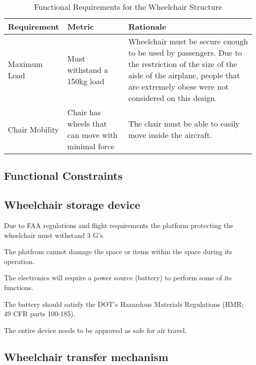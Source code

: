 \begin{table}
\begin{tabular} {| p{4cm} | p{5cm} | p{5cm} |}
\hline
\textbf{Requirement} & \textbf{Metric} & \textbf{Rationale} \\ \hline

Maximum Load & Must withstand a 150kg load & Wheelchair must be secure enough to be used by passengers. Due to the restriction of the size of the aisle of the airplane, people that are extremely obese were not considered on this design. \\ \hline
Chair Mobility & Chair has wheels that can move with minimal force & The chair must be able to easily move inside the aircraft. \\ \hline
\end{tabular} 
\caption{Functional Requirements for the Wheelchair Structure}
\label{tab:functional_requirements_wheelchair}
\end{table}

\clearpage
\newpage

\subsection{Functional Constraints}

\subsection*{Wheelchair storage device}

\begin{list}{-}{}
  \item Due to FAA regulations and flight requirements the platform protecting the wheelchair must withstand 3 G's.
  \item The platfrom cannot damage the space or items within the space during its operation.
  \item The electronics will require a power source (battery) to perform some of its functions.
  \item The battery should satisfy the DOT’s Hazardous Materials Regulations (HMR; 49 CFR parts 100-185).
  \item The entire device needs to be approved as safe for air travel.
\end{list}

\subsection*{Wheelchair transfer mechanism}

